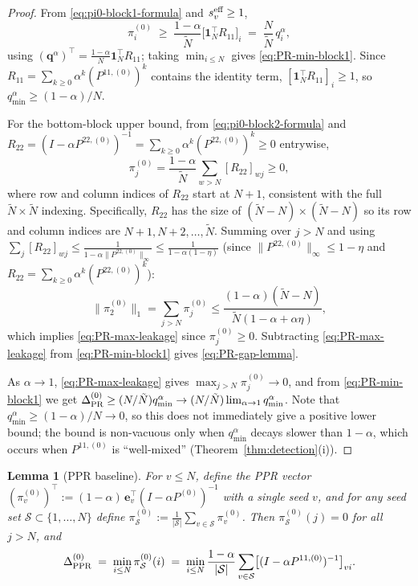 \documentclass{article}
\theoremstyle{plain}
\newtheorem{lemma}[theorem]{Lemma}
\theoremstyle{definition}
\def\tp{\intercal}
\def\by{\times}
\newcommand{\arXivtag}[1][]{#1}
\begin{document}
\begin{proof}
	From \eqref{eq:pi0-block1-formula} and $s_v^{\textnormal{eff}} \geq 1$,
	\[
	\pi_i^{(0)} \;\geq\; \frac{1-\alpha}{\tilde N}\bigl[\mathbf{1}_N^\tp R_{11}\bigr]_i \;=\; \frac{N}{\tilde N}\,q_i^\alpha,
	\]
	using $(\mathbf{q}^{\alpha})^\tp = \tfrac{1-\alpha}{N}\mathbf{1}_N^\tp R_{11}$; taking $\min_{i\leq N}$ gives \eqref{eq:PR-min-block1}. Since $R_{11} = \sum_{k \geq 0}\alpha^k(P^{11,(0)})^k$ contains the identity term, $[\mathbf{1}_N^\tp R_{11}]_i \geq 1$, so $q_{\min}^\alpha \geq (1-\alpha)/N$.
	
	For the \arXivtag[bottom-block] upper bound, from \eqref{eq:pi0-block2-formula} and $R_{22} = (I-\alpha P^{22,(0)})^{-1} = \sum_{k\geq 0}\alpha^k(P^{22,(0)})^k \geq 0$ entrywise,
		\[
		\pi_j^{(0)} = \frac{1-\alpha}{\tilde{N}}\sum_{w>N}[R_{22}]_{wj} \geq 0,
		\]
        \arXivtag[where row and column indices of $R_{22}$ start at $N+1$, consistent with the full $\tilde{N}\times\tilde{N}$ indexing. Specifically, $R_{22}$ has the size of $(\tilde N - N) \by (\tilde N - N)$ so its row and column indices are $N+1, N+2, \ldots, \tilde{N}$.]
		Summing over $j > N$ and using $\sum_j [R_{22}]_{wj} \leq \frac{1}{1-\alpha\|P^{22,(0)}\|_\infty} \leq \frac{1}{1-\alpha(1-\eta)}$
		(since $\|P^{22,(0)}\|_\infty \leq 1-\eta$ and $R_{22} = \sum_{k\geq 0}\alpha^k(P^{22,(0)})^k$):
		\[
		\|{\pi}_2^{(0)}\|_1 = \sum_{j>N}\pi_j^{(0)} \leq \frac{(1-\alpha)(\tilde{N}-N)}{\tilde{N}(1-\alpha+\alpha\eta)},
		\]
		which implies \eqref{eq:PR-max-leakage} since $\pi_j^{(0)} \geq 0$. Subtracting \eqref{eq:PR-max-leakage} from \eqref{eq:PR-min-block1} gives \eqref{eq:PR-gap-lemma}.
	
	As $\alpha \to 1$, \eqref{eq:PR-max-leakage} gives $\max_{j>N}\pi_j^{(0)} \to 0$, and from \eqref{eq:PR-min-block1} we get $\Delta^{(0)}_{\textnormal{PR}} \geq (N/\tilde{N})q^\alpha_{\min} \to (N/\tilde{N})\lim_{\alpha\to 1}q^\alpha_{\min}$. Note that $q^\alpha_{\min} \geq (1-\alpha)/N \to 0$, so this does not immediately give a positive lower bound; the bound is non-vacuous only when $q^\alpha_{\min}$ decays slower than $1-\alpha$, which occurs when $P^{11,(0)}$ is ``well-mixed'' (Theorem~\ref{thm:detection}(i)).
\end{proof}

\begin{lemma}[PPR baseline]\label{lem:ppr-combined}
	For $v \leq N$, define the PPR vector $({\pi}_v^{(0)})^\tp := (1-\alpha)\,\mathbf{e}_v^\tp(I-\alpha P^{(0)})^{-1}$ with a single seed $v$,
		and for any seed set $\mathcal{S} \subset \{1,\ldots,N\}$ define
		${\pi}_{\mathcal{S}}^{(0)} := \frac{1}{|\mathcal{S}|}\sum_{v \in \mathcal{S}}{\pi}_v^{(0)}$.
	Then $\pi_{\mathcal{S}}^{(0)}(j) = 0$ for all $j > N$, and
	\begin{equation}\label{eq:PPR-gap-lemma}
		\Delta^{(0)}_{\textnormal{PPR}} \;=\; \min_{i \leq N}\pi_{\mathcal{S}}^{(0)}(i) \;=\; \min_{i \leq N}\frac{1-\alpha}{|\mathcal{S}|}\sum_{v \in \mathcal{S}}\bigl[(I - \alpha P^{11,(0)})^{-1}\bigr]_{vi}.
	\end{equation}
\end{lemma}
\end{document}
